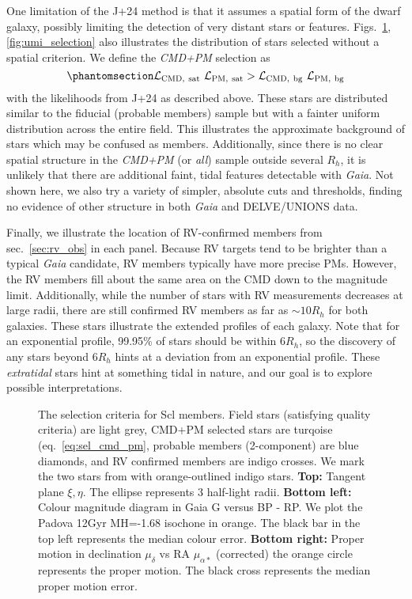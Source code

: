 One limitation of the J+24 method is that it assumes a spatial form of
the dwarf galaxy, possibly limiting the detection of very distant stars
or features. Figs.~\ref{fig:sculptor_selection}, \ref{fig:umi_selection}
also illustrates the distribution of stars selected without a spatial
criterion. We define the \emph{CMD+PM} selection as
\begin{equation}\protect\phantomsection\label{eq:sel_cmd_pm}{
{\cal L}_{\rm CMD,\ sat}\ {\cal L}_{\rm PM,\ sat} > {\cal L}_{\rm CMD,\ bg}\ {\cal L}_{\rm PM,\ bg}
}\end{equation} with the likelihoods from J+24 as described above. These
stars are distributed similar to the fiducial (probable members) sample
but with a fainter uniform distribution across the entire field. This
illustrates the approximate background of stars which may be confused as
members. Additionally, since there is no clear spatial structure in the
\emph{CMD+PM} (or \emph{all}) sample outside several \(R_h\), it is
unlikely that there are additional faint, tidal features detectable with
\emph{Gaia}. Not shown here, we also try a variety of simpler, absolute
cuts and thresholds, finding no evidence of other structure in both
\emph{Gaia} and DELVE/UNIONS data.

Finally, we illustrate the location of RV-confirmed members from
sec.~\ref{sec:rv_obs} in each panel. Because RV targets tend to be
brighter than a typical \emph{Gaia} candidate, RV members typically have
more precise PMs. However, the RV members fill about the same area on
the CMD down to the magnitude limit. Additionally, while the number of
stars with RV measurements decreases at large radii, there are still
confirmed RV members as far as \(\sim 10R_h\) for both galaxies. These
stars illustrate the extended profiles of each galaxy. Note that for an
exponential profile, 99.95\% of stars should be within \(6R_h\), so the
discovery of any stars beyond \(6R_h\) hints at a deviation from an
exponential profile. These \emph{extratidal} stars hint at something
tidal in nature, and our goal is to explore possible interpretations.

\begin{figure}
\centering
{}
\caption[Sculptor sample selection]{The selection criteria for Scl
members. Field stars (satisfying quality criteria) are light grey,
CMD+PM selected stars are turqoise (eq.~\ref{eq:sel_cmd_pm}, probable
members (2-component) are blue diamonds, and RV confirmed members are
indigo crosses. We mark the two stars from \citet{sestito+2023a} with
orange-outlined indigo stars. \textbf{Top:} Tangent plane \(\xi, \eta\).
The ellipse represents 3 half-light radii. \textbf{Bottom left:} Colour
magnitude diagram in Gaia G versus BP - RP. We plot the Padova 12Gyr
MH=-1.68 isochone in orange. The black bar in the top left represents
the median colour error. \textbf{Bottom right:} Proper motion in
declination \(\mu_\delta\) vs RA \(\mu_{\alpha*}\) (corrected) the
orange circle represents the \citet{MV2020b} proper motion. The black
cross represents the median proper motion
error.}\label{fig:sculptor_selection}
\end{figure}


